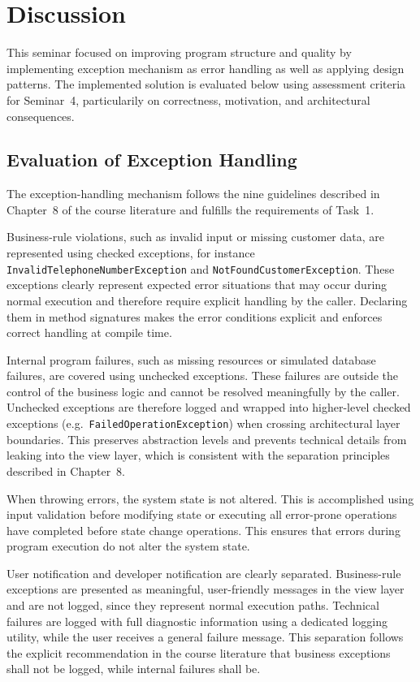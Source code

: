 \documentclass[a4paper]{scrartcl}
\begin{document}
\section{Discussion}

This seminar focused on improving program structure and quality by implementing exception mechanism as error handling as well as applying design patterns. The implemented solution is evaluated below using assessment criteria for Seminar~4, particularily on correctness, motivation, and architectural consequences.

\subsection{Evaluation of Exception Handling}

The exception-handling mechanism follows the nine guidelines described in Chapter~8 of the course literature and fulfills the requirements of Task~1.

Business-rule violations, such as invalid input or missing customer data, are represented using checked exceptions, for instance \texttt{InvalidTelephoneNumberException} and \texttt{NotFoundCustomerException}. These exceptions clearly represent expected error situations that may occur during normal execution and therefore require explicit handling by the caller. Declaring them in method signatures makes the error conditions explicit and enforces correct handling at compile time.

Internal program failures, such as missing resources or simulated database failures, are covered using unchecked exceptions. These failures are outside the control of the business logic and cannot be resolved meaningfully by the caller. Unchecked exceptions are therefore logged and wrapped into higher-level checked exceptions (e.g.\ \texttt{FailedOperationException}) when crossing architectural layer boundaries. This preserves abstraction levels and prevents technical details from leaking into the view layer, which is consistent with the separation principles described in Chapter~8.

When throwing errors, the system state is not altered. This is accomplished using input validation before modifying state or executing all error-prone operations have completed before state change operations. This ensures that errors during program execution do not alter the system state.

User notification and developer notification are clearly separated. Business-rule exceptions are presented as meaningful, user-friendly messages in the view layer and are not logged, since they represent normal execution paths. Technical failures are logged with full diagnostic information using a dedicated logging utility, while the user receives a general failure message. This separation follows the explicit recommendation in the course literature that business exceptions shall not be logged, while internal failures shall be.
\end{document}
